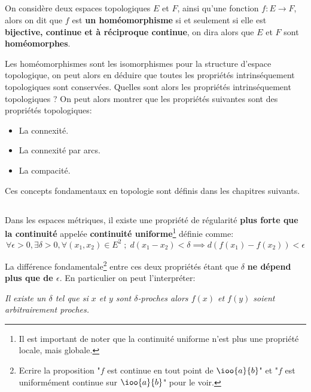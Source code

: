 \subsection*{}
On considère deux espaces topologiques \(E\) et \(F\), ainsi qu'une fonction \(f : E \longrightarrow F\), alors on dit que \(f\) est \textbf{un homéomorphisme} si et seulement si elle est \textbf{bijective, continue et à réciproque continue}, on dira alors que \(E\) et \(F\) sont \textbf{homéomorphes}.\<

Les homéomorphismes sont les isomorphismes pour la structure d'espace topologique, on peut alors en déduire que toutes les propriétés intrinséquement topologiques sont conservées. Quelles sont alors les propriétés intrinséquement topologiques ? On peut alors montrer que les propriétés suivantes sont des propriétés topologiques:
\begin{itemize}
   \item La connexité.
   \item La connexité par arcs.
   \item La compacité.
\end{itemize}
Ces concepts fondamentaux en topologie sont définis dans les chapitres suivants.

\subsection*{}
Dans les espaces métriques, il existe une propriété de régularité \textbf{plus forte que la continuité} appelée \textbf{continuité uniforme}\footnote[1]{Il est important de noter que la continuité uniforme n'est plus une propriété locale, mais globale.} définie comme:
\[
   \forall \epsilon > 0 , \exists \delta > 0 , \forall (x_1, x_2) \in E^2 \; ; \; d(x_1 - x_2) < \delta \implies d(f(x_1) - f(x_2)) < \epsilon 
\]

La différence fondamentale\footnote[2]{Ecrire la proposition "\(f\) est continue en tout point de \(\ioo{a}{b}\)" et "\(f\) est uniformément continue sur \(\ioo{a}{b}\)" pour le voir.} entre ces deux propriétés étant que \(\delta\) \textbf{ne dépend plus que de \(\epsilon\)}. En particulier on peut l'interpréter:
\begin{center}      
   \textit{Il existe un \(\delta\) tel que si \(x\) et \(y\) sont \(\delta\)-proches alors \(f(x)\) et \(f(y)\) soient arbitrairement proches.}
\end{center}
